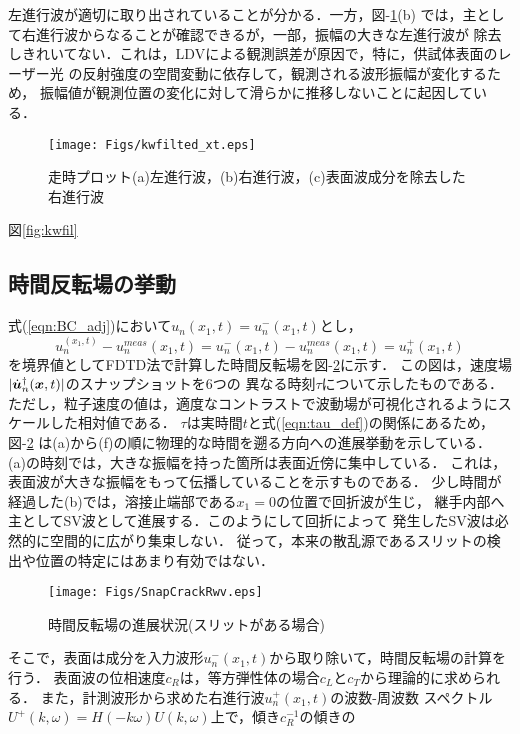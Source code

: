 左進行波が適切に取り出されていることが分かる．一方，{\rm 図}-\ref{fig:kwfilted_xt}(b)
では，主として右進行波からなることが確認できるが，一部，振幅の大きな左進行波が
除去しきれいてない．これは，LDVによる観測誤差が原因で，特に，供試体表面のレーザー光
の反射強度の空間変動に依存して，観測される波形振幅が変化するため，
振幅値が観測位置の変化に対して滑らかに推移しないことに起因している．
\begin{figure}[htb]
\centering
	\texttt{[image: Figs/kwfilted\_xt.eps]}
	\caption{走時プロット(a)左進行波，(b)右進行波，(c)表面波成分を除去した右進行波}
	\label{fig:kwfilted_xt}
\end{figure}
図\ref{fig:kwfil}
\subsection{時間反転場の挙動}
式(\ref{eqn:BC_adj})において$u_n(x_1,t)=u_n^-(x_1,t)$とし，
\begin{equation}
	u_n^(x_1,t) - u_n^{meas}(x_1,t)
	=
	u_n^-(x_1,t) - u_n^{meas}(x_1,t)
	=
	u_n^+(x_1,t)
	\label{eqn:BC_rwv}
\end{equation}
を境界値としてFDTD法で計算した時間反転場を{\rm 図}-\ref{fig:snap_crack_rwv}に示す．
この図は，速度場$| \dot{\boldsymbol{u}}_n^{\dagger}(\boldsymbol{x},t)|$のスナップショットを6つの
異なる時刻$\tau$について示したものである．
ただし，粒子速度の値は，適度なコントラストで波動場が可視化されるようにスケールした相対値である．
$\tau$は実時間$t$と式(\ref{eqn:tau_def})の関係にあるため，{\rm 図}-\ref{fig:snap_crack_rwv}
は(a)から(f)の順に物理的な時間を遡る方向への進展挙動を示している．
(a)の時刻では，大きな振幅を持った箇所は表面近傍に集中している．
これは，表面波が大きな振幅をもって伝播していることを示すものである．
少し時間が経過した(b)では，溶接止端部である$x_1=0$の位置で回折波が生じ，
継手内部へ主としてSV波として進展する．このようにして回折によって
発生したSV波は必然的に空間的に広がり集束しない．
従って，本来の散乱源であるスリットの検出や位置の特定にはあまり有効ではない．
\begin{figure}
\centering
	\texttt{[image: Figs/SnapCrackRwv.eps]}
	\caption{時間反転場の進展状況(スリットがある場合)}
	\label{fig:snap_crack_rwv}
\end{figure}
そこで，表面は成分を入力波形$u_n^{-}(x_1,t)$から取り除いて，時間反転場の計算を行う．
表面波の位相速度$c_R$は，等方弾性体の場合$c_L$と$c_T$から理論的に求められる．
また，計測波形から求めた右進行波$u_n^+(x_1,t)$の波数-周波数
スペクトル$U^+(k,\omega)=H(-k\omega)U(k,\omega)$上で，傾き$c_R^{-1}$の傾きの
